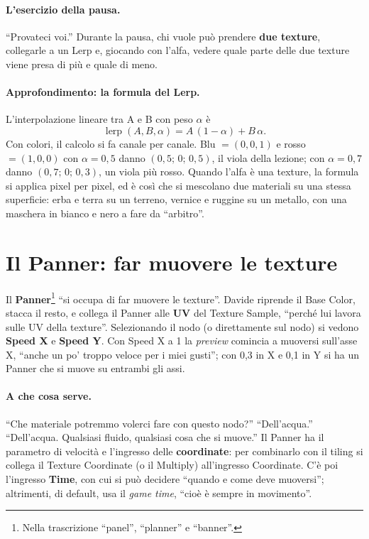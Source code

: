 \paragraph{L'esercizio della pausa.} ``Provateci voi.'' Durante la pausa, chi vuole può
prendere \textbf{due texture}, collegarle a un Lerp e, giocando con l'alfa, vedere quale
parte delle due texture viene presa di più e quale di meno.

\paragraph{Approfondimento: la formula del Lerp.} L'interpolazione lineare tra A e B
con peso $\alpha$ è
\[
  \operatorname{lerp}(A, B, \alpha) = A\,(1-\alpha) + B\,\alpha .
\]
Con colori, il calcolo si fa canale per canale. Blu $=(0,0,1)$ e rosso $=(1,0,0)$ con
$\alpha = 0{,}5$ danno $(0{,}5;\,0;\,0{,}5)$, il viola della lezione; con $\alpha =
0{,}7$ danno $(0{,}7;\,0;\,0{,}3)$, un viola più rosso. Quando l'alfa è una texture, la
formula si applica pixel per pixel, ed è così che si mescolano due materiali su una
stessa superficie: erba e terra su un terreno, vernice e ruggine su un metallo, con una
maschera in bianco e nero a fare da ``arbitro''.

\section{Il Panner: far muovere le texture}
\label{ue3:sec:panner}

Il \textbf{Panner}\footnote{Nella trascrizione ``panel'', ``planner'' e ``banner''.}
``si occupa di far muovere le texture''. Davide riprende il Base Color, stacca il resto,
e collega il Panner alle \textbf{UV} del Texture Sample, ``perché lui lavora sulle UV
della texture''. Selezionando il nodo (o direttamente sul nodo) si vedono
\textbf{Speed X} e \textbf{Speed Y}. Con Speed X a 1 la \emph{preview} comincia a
muoversi sull'asse X, ``anche un po' troppo veloce per i miei gusti''; con 0,3 in X e
0,1 in Y si ha un Panner che si muove su entrambi gli assi.

\paragraph{A che cosa serve.} ``Che materiale potremmo volerci fare con questo nodo?''
``Dell'acqua.'' ``Dell'acqua. Qualsiasi fluido, qualsiasi cosa che si muove.'' Il Panner
ha il parametro di velocità e l'ingresso delle \textbf{coordinate}: per combinarlo con il
tiling si collega il Texture Coordinate (o il Multiply) all'ingresso Coordinate. C'è
poi l'ingresso \textbf{Time}, con cui si può decidere ``quando e come deve muoversi'';
altrimenti, di default, usa il \emph{game time}, ``cioè è sempre in movimento''.

